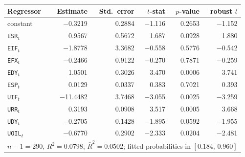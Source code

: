 \begin{tabular}{lrrrrr}
\toprule
Regressor & Estimate & Std.\ error & $t$-stat & $p$-value & robust $t$ \\
\midrule
constant & \ensuremath{-}0.3219 & 0.2884 & \ensuremath{-}1.116 & 0.2653 & \ensuremath{-}1.152 \\
\texttt{ESR}$_t$ & 0.9567 & 0.5672 & 1.687 & 0.0928 & 1.880 \\
\texttt{EIF}$_t$ & \ensuremath{-}1.8778 & 3.3682 & \ensuremath{-}0.558 & 0.5776 & \ensuremath{-}0.542 \\
\texttt{EFX}$_t$ & \ensuremath{-}0.2466 & 0.9122 & \ensuremath{-}0.270 & 0.7871 & \ensuremath{-}0.259 \\
\texttt{EDY}$_t$ & 1.0501 & 0.3026 & 3.470 & 0.0006 & 3.741 \\
\texttt{ESP}$_t$ & 0.0129 & 0.0337 & 0.383 & 0.7021 & 0.393 \\
\texttt{UIF}$_t$ & \ensuremath{-}11.4482 & 3.7468 & \ensuremath{-}3.055 & 0.0025 & \ensuremath{-}3.259 \\
\texttt{URR}$_t$ & 0.3193 & 0.0908 & 3.517 & 0.0005 & 3.668 \\
\texttt{UDY}$_t$ & \ensuremath{-}0.2705 & 0.1428 & \ensuremath{-}1.895 & 0.0592 & \ensuremath{-}1.955 \\
\texttt{UOIL}$_t$ & \ensuremath{-}0.6770 & 0.2902 & \ensuremath{-}2.333 & 0.0204 & \ensuremath{-}2.481 \\
\midrule
\multicolumn{6}{l}{\footnotesize $n-1=290$, $R^2=0.0798$, $\bar R^2=0.0502$; fitted probabilities in $[0.184,\,0.960]$} \\
\bottomrule
\end{tabular}
